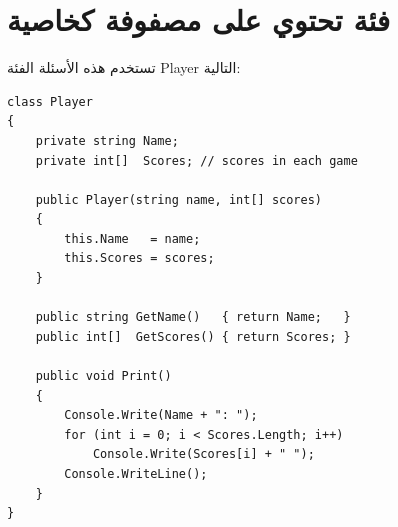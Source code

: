 \documentclass[14pt]{extarticle}
\begin{document}
\clearpage
\section{فئة تحتوي على مصفوفة كخاصية}

تستخدم هذه الأسئلة الفئة \textenglish{Player} التالية:

\begin{boxExample}
\begin{english}
{\small
\begin{verbatim}
class Player
{
    private string Name;
    private int[]  Scores; // scores in each game

    public Player(string name, int[] scores)
    {
        this.Name   = name;
        this.Scores = scores;
    }

    public string GetName()   { return Name;   }
    public int[]  GetScores() { return Scores; }

    public void Print()
    {
        Console.Write(Name + ": ");
        for (int i = 0; i < Scores.Length; i++)
            Console.Write(Scores[i] + " ");
        Console.WriteLine();
    }
}
\end{verbatim}
}
\end{english}
\end{boxExample}
\end{document}
